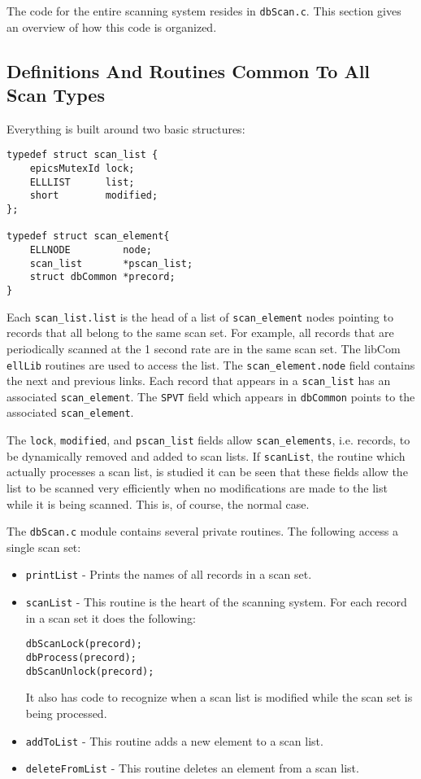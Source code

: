 The code for the entire scanning system resides in \verb|dbScan.c|.
This section gives an overview of how this code is organized.

\subsection{Definitions And Routines Common To All Scan Types}

Everything is built around two basic structures:

\begin{verbatim}
typedef struct scan_list {
    epicsMutexId lock;
    ELLLIST      list;
    short        modified;
};

typedef struct scan_element{
    ELLNODE         node;
    scan_list       *pscan_list;
    struct dbCommon *precord;
}
\end{verbatim}

Each \verb|scan_list.list| is the head of a list of \verb|scan_element| nodes pointing to records that all belong to the same scan set.
For example, all records that are periodically scanned at the 1 second rate are in the same scan set.
The libCom \verb|ellLib| routines are used to access the list.
The \verb|scan_element.node| field contains the next and previous links.
Each record that appears in a \verb|scan_list| has an associated \verb|scan_element|.
The \verb|SPVT| field which appears in \verb|dbCommon| points to the associated \verb|scan_element|.

The \verb|lock|, \verb|modified|, and \verb|pscan_list| fields allow \verb|scan_elements|, i.e. records, to be dynamically removed and added to scan lists.
If \verb|scanList|, the routine which actually processes a scan list, is studied it can be seen that these fields allow the list to be scanned very efficiently when no modifications are made to the list while it is being scanned.
This is, of course, the normal case.

The \verb|dbScan.c| module contains several private routines.
The following access a single scan set: 

\begin{itemize}
\item \verb|printList| - Prints the names of all records in a scan set.

\item \verb|scanList| - This routine is the heart of the scanning system.
For each record in a scan set it does the following:

\begin{verbatim}
dbScanLock(precord);
dbProcess(precord);
dbScanUnlock(precord);
\end{verbatim}

It also has code to recognize when a scan list is modified while the scan set is being processed.

\item \verb|addToList| - This routine adds a new element to a scan list.

\item \verb|deleteFromList| - This routine deletes an element from a scan list.

\end{itemize}

